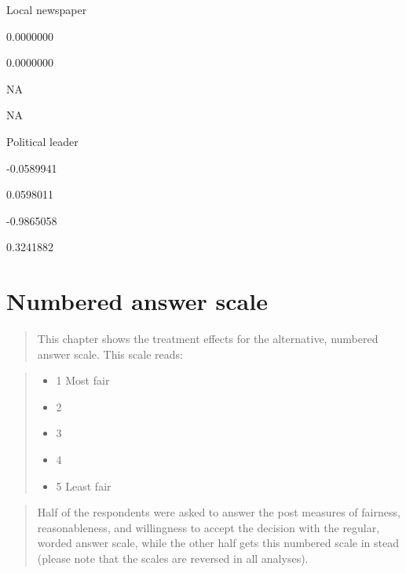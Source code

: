 \documentclass[]{book}
\providecommand{\tightlist}{%
  \setlength{\itemsep}{0pt}\setlength{\parskip}{0pt}}
\begin{document}
Local newspaper

0.0000000

0.0000000

NA

NA

Political leader

-0.0589941

0.0598011

-0.9865058

0.3241882

\chapter{Numbered answer scale}\label{numbered-answer-scale}

\begin{quote}
This chapter shows the treatment effects for the alternative, numbered
answer scale. This scale reads:
\end{quote}

\begin{quote}
\begin{itemize}
\tightlist
\item
  1 Most fair\\
\item
  2\\
\item
  3\\
\item
  4\\
\item
  5 Least fair
\end{itemize}
\end{quote}

\begin{quote}
Half of the respondents were asked to answer the post measures of
fairness, reasonableness, and willingness to accept the decision with
the regular, worded answer scale, while the other half gets this
numbered scale in stead (please note that the scales are reversed in all
analyses).
\end{quote}
\end{document}

